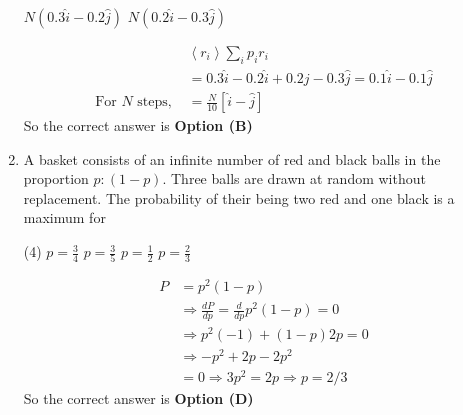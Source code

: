 \begin{enumerate}
\begin{tasks}
		\task[\textbf{C.}] $N(0.3 \hat{i}-0.2 \hat{j})$
		\task[\textbf{D.}] $N(0.2 \hat{i}-0.3 \hat{j})$
	\end{tasks}
	\begin{answer}
		\begin{align*}
		&\left\langle r_{i}\right\rangle \sum_{i} p_{i} r_{i}\\
		&=0.3 \hat{i}-0.2 \hat{i}+0.2 j-0.3 \hat{j}=0.1 \hat{i}-0.1 \hat{j}\\
		\text{For $N$ steps, }&=\frac{N}{10}[\hat{i}-\hat{j}]
		\end{align*}
		So the correct answer is \textbf{Option (B)}
	\end{answer}
	\item A basket consists of an infinite number of red and black balls in the proportion $p:(1-p)$. Three balls are drawn at random without replacement. The probability of their being two red and one black is a maximum for
	{}
	\begin{tasks}(4)
		\task[\textbf{A.}]  $p=\frac{3}{4}$
		\task[\textbf{B.}] $p=\frac{3}{5}$
		\task[\textbf{C.}] $p=\frac{1}{2}$
		\task[\textbf{D.}] $p=\frac{2}{3}$
	\end{tasks}
	\begin{answer}
		\begin{align*}
		P&=p^{2}(1-p) \quad \\&\Rightarrow \frac{d P}{d p}=\frac{d}{d p} p^{2}(1-p)=0 \\&\Rightarrow p^{2}(-1)+(1-p) 2 p=0\\
		&\Rightarrow-p^{2}+2 p-2 p^{2}\\&=0 \Rightarrow 3 p^{2}=2 p \Rightarrow p=2 / 3
		\end{align*}
		So the correct answer is \textbf{Option (D)}
	\end{answer}
	
	
	
	
	
	
	
	
	
	
	
	
	

\end{enumerate}
